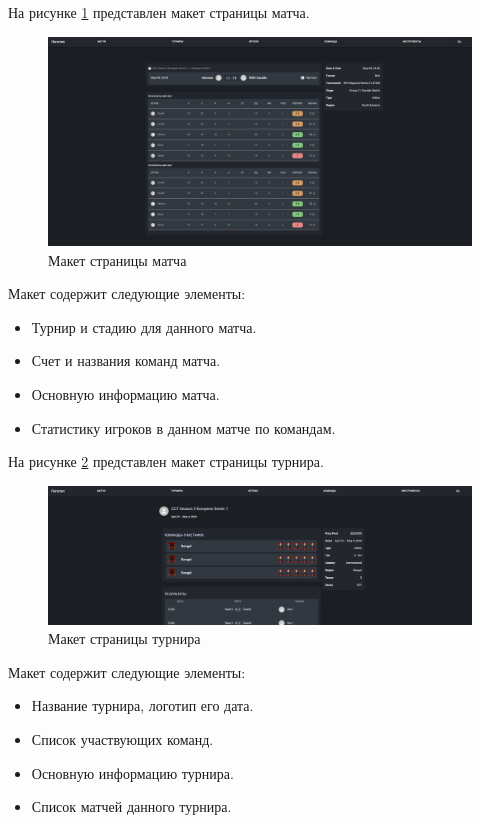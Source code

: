 На рисунке \ref{fig:-matchPage} представлен макет страницы матча.
\begin{figure}
	\centering
	\includegraphics[width=0.8\linewidth]{"images/Страница матча"}
	\caption{Макет страницы матча}
	\label{fig:-matchPage}
\end{figure}

Макет содержит следующие элементы:
\begin{itemize}
	\item Турнир и стадию для данного матча.
	\item Счет и названия команд матча.
	\item Основную информацию матча.
	\item Статистику игроков в данном матче по командам.
\end{itemize}

На рисунке \ref{fig:-tournamentPage} представлен макет страницы турнира.
\begin{figure}
	\centering
	\includegraphics[width=0.8\linewidth]{"images/Страница турнира"}
	\caption{Макет страницы турнира}
	\label{fig:-tournamentPage}
\end{figure}

Макет содержит следующие элементы:
\begin{itemize}
	\item Название турнира, логотип его дата.
	\item Список участвующих команд.
	\item Основную информацию турнира.
	\item Список матчей данного турнира.
\end{itemize}
